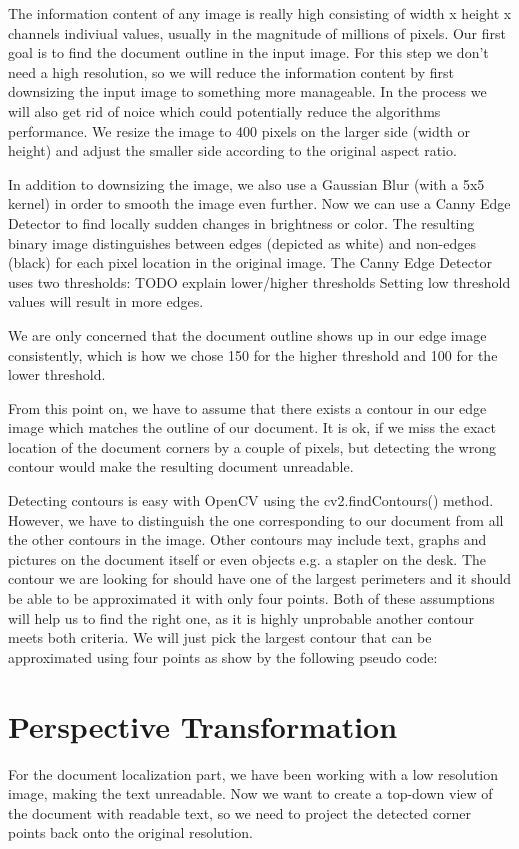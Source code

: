 \documentclass[bibliography=totoc]{scrartcl}
\begin{document}
	The information content of any image is really high consisting of width x height x channels indiviual values, usually in the magnitude of millions of pixels.
	Our first goal is to find the document outline in the input image.
	For this step we don't need a high resolution, so we will reduce the information content by first downsizing the input image to something more manageable.
	In the process we will also get rid of noice which could potentially reduce the algorithms performance.
	We resize the image to 400 pixels on the larger side (width or height) and adjust the smaller side according to the original aspect ratio.
	
	In addition to downsizing the image, we also use a Gaussian Blur (with a 5x5 kernel) in order to smooth the image even further.
	Now we can use a Canny Edge Detector to find locally sudden changes in brightness or color. 
	The resulting binary image distinguishes between edges (depicted as white) and non-edges (black) for each pixel location in the original image.
	The Canny Edge Detector uses two thresholds: TODO explain lower/higher thresholds
	Setting low threshold values will result in more edges.
	
	We are only concerned that the document outline shows up in our edge image consistently, which is how we chose 150 for the higher threshold and 100 for the lower threshold.
	
	From this point on, we have to assume that there exists a contour in our edge image which matches the outline of our document. 
	It is ok, if we miss the exact location of the document corners by a couple of pixels, but detecting the wrong contour would make the resulting document unreadable.

	Detecting contours is easy with OpenCV using the cv2.findContours() method.
	However, we have to distinguish the one corresponding to our document from all the other contours in the image.
	Other contours may include text, graphs and pictures on the document itself or even objects e.g. a stapler on the desk. 
	The contour we are looking for should have one of the largest perimeters and it should be able to be approximated it with only four points.
	Both of these assumptions will help us to find the right one, as it is highly unprobable another contour meets both criteria. 
	We will just pick the largest contour that can be approximated using four points as show by the following pseudo code:
	
	\section{Perspective Transformation}
	For the document localization part, we have been working with a low resolution image, making the text unreadable.
	Now we want to create a top-down view of the document with readable text, so we need to project the detected corner points back onto the original resolution. 
\end{document}
